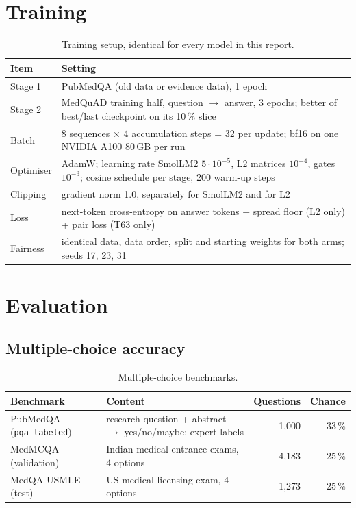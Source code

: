 \documentclass[a4paper,11pt,parskip=half]{scrartcl}
\newcommand{\code}[1]{\texttt{\small #1}}
\begin{document}
\section{Training}

\begin{table}[H]
\centering\small
\begin{tabularx}{\linewidth}{@{}lY@{}}
\toprule
Item & Setting\\
\midrule
Stage 1 & PubMedQA (old data or evidence data), 1 epoch\\
Stage 2 & MedQuAD training half, question $\rightarrow$ answer, 3 epochs; better of best/last checkpoint on its 10\,\% slice\\
Batch & 8 sequences $\times$ 4 accumulation steps = 32 per update; bf16 on one NVIDIA A100 80\,GB per run\\
Optimiser & AdamW; learning rate SmolLM2 $5\cdot10^{-5}$, L2 matrices $10^{-4}$, gates $10^{-3}$; cosine schedule per stage, 200 warm-up steps\\
Clipping & gradient norm 1.0, separately for SmolLM2 and for L2\\
Loss & next-token cross-entropy on answer tokens + spread floor (L2 only) + pair loss (T63 only)\\
Fairness & identical data, data order, split and starting weights for both arms; seeds 17, 23, 31\\
\bottomrule
\end{tabularx}
\caption{Training setup, identical for every model in this report.}
\end{table}

\section{Evaluation}
\label{sec:eval}

\subsection{Multiple-choice accuracy}

\begin{table}[H]
\centering\small
\begin{tabularx}{\linewidth}{@{}lYrr@{}}
\toprule
Benchmark & Content & Questions & Chance\\
\midrule
PubMedQA (\code{pqa\_labeled})~\cite{pubmedqa} & research question + abstract $\rightarrow$ yes/no/maybe; expert labels & 1{,}000 & 33\,\%\\
MedMCQA (validation)~\cite{medmcqa} & Indian medical entrance exams, 4 options & 4{,}183 & 25\,\%\\
MedQA-USMLE (test)~\cite{medqa} & US medical licensing exam, 4 options & 1{,}273 & 25\,\%\\
\bottomrule
\end{tabularx}
\caption{Multiple-choice benchmarks.}
\end{table}
\end{document}
